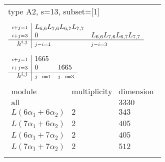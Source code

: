 \documentclass[crop,border=2mm]{standalone}
\begin{document}
\begin{tabular}{l}
{\huge type A2, s=13, subset=[1]}\\ \\


$\displaystyle
\begin{array}{r|l l}
	{\scriptstyle i+j=1}&L_{6,6}L_{7,6}L_{6,7}L_{7,7}&\\
	{\scriptstyle i+j=3}&0&L_{6,6}L_{7,6}L_{6,7}L_{7,7}\\
	\hline h^{i,j}&{\scriptstyle j-i=1}&{\scriptstyle j-i=3}
\end{array}
$ \\ \\


$\displaystyle
\begin{array}{r|l l}
	{\scriptstyle i+j=1}&1665&\\
	{\scriptstyle i+j=3}&0&1665\\
	\hline h^{i,j}&{\scriptstyle j-i=1}&{\scriptstyle j-i=3}
\end{array}
$ \\ \\


$\displaystyle
\begin{array}{rll}
	\text{module}&\text{multiplicity}&\text{dimension} \\ \hline \text{all}&&3330 \\
	L\left( 6\alpha_{1}+ 6\alpha_{2}\right)&2&343\\
	L\left( 7\alpha_{1}+ 6\alpha_{2}\right)&2&405\\
	L\left( 6\alpha_{1}+ 7\alpha_{2}\right)&2&405\\
	L\left( 7\alpha_{1}+ 7\alpha_{2}\right)&2&512
\end{array}
$ \\ \\

\end{tabular}
\end{document}
